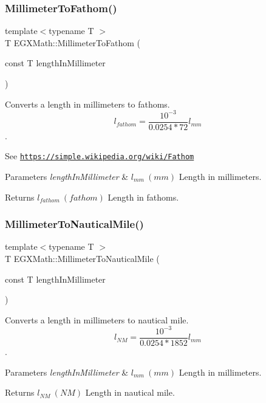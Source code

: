 \subsubsection{\texorpdfstring{Millimeter\+To\+Fathom()}{MillimeterToFathom()}}
{\footnotesize\ttfamily template$<$typename T $>$ \\
T E\+G\+X\+Math\+::\+Millimeter\+To\+Fathom (\begin{DoxyParamCaption}\item[{const T}]{length\+In\+Millimeter }\end{DoxyParamCaption})}



Converts a length in millimeters to fathoms. \[ l_{fathom}= \frac{10^{-3}}{0.0254 * 72} l_{mm} \]. 

See \href{https://simple.wikipedia.org/wiki/Fathom}{\tt https\+://simple.\+wikipedia.\+org/wiki/\+Fathom} 
\begin{DoxyParams}{Parameters}
{\em length\+In\+Millimeter} & $ l_{mm}\ (mm)$ Length in millimeters. \\
\hline
\end{DoxyParams}
\begin{DoxyReturn}{Returns}
$ l_{fathom}\ (fathom)$ Length in fathoms. 
\end{DoxyReturn}
\mbox{\label{group___e_g_x_math-_conversions-_length_conversions-_millimeter-_nautical_ga05ed5fb1300287763d8927ee90315808}} 
\subsubsection{\texorpdfstring{Millimeter\+To\+Nautical\+Mile()}{MillimeterToNauticalMile()}}
{\footnotesize\ttfamily template$<$typename T $>$ \\
T E\+G\+X\+Math\+::\+Millimeter\+To\+Nautical\+Mile (\begin{DoxyParamCaption}\item[{const T}]{length\+In\+Millimeter }\end{DoxyParamCaption})}



Converts a length in millimeters to nautical mile. \[ l_{NM}= \frac{10^{-3}}{0.0254 * 1852} l_{mm} \]. 


\begin{DoxyParams}{Parameters}
{\em length\+In\+Millimeter} & $ l_{mm}\ (mm)$ Length in millimeters. \\
\hline
\end{DoxyParams}
\begin{DoxyReturn}{Returns}
$ l_{NM}\ (NM)$ Length in nautical mile. 
\end{DoxyReturn}
